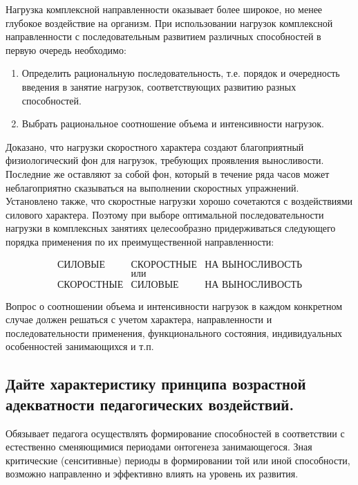 Нагрузка комплексной направленности оказывает более широкое, но менее глубокое воздействие на организм.
При использовании нагрузок комплексной направленности с последовательным развитием различных способностей в первую очередь
необходимо:
\begin{enumerate}
    \item Определить рациональную последовательность, т.е. порядок и очередность введения в занятие нагрузок,
          соответствующих развитию разных способностей.
    \item Выбрать рациональное соотношение объема и интенсивности нагрузок.
\end{enumerate}

Доказано, что нагрузки скоростного характера создают благоприятный физиологический фон для нагрузок, требующих проявления выносливости. Последние же оставляют за собой фон, который в течение ряда часов может неблагоприятно сказываться на выполнении скоростных упражнений. Установлено также, что скоростные нагрузки хорошо сочетаются с воздействиями силового характера. Поэтому при выборе оптимальной последовательности нагрузки в комплексных занятиях целесообразно придерживаться следующего порядка применения по их преимущественной направленности:

\begin{equation*}
    \begin{array}{lcr}
        \text{СИЛОВЫЕ}    & \text{СКОРОСТНЫЕ} & \text{НА ВЫНОСЛИВОСТЬ} \\
                          & \text{или}        &                        \\
        \text{СКОРОСТНЫЕ} & \text{СИЛОВЫЕ}    & \text{НА ВЫНОСЛИВОСТЬ}
    \end{array}
\end{equation*}

Вопрос о соотношении объема и интенсивности нагрузок в каждом конкретном случае должен решаться с учетом характера,
направленности и последовательности применения, функционального состояния, индивидуальных особенностей занимающихся и т.п.


\subsection{Дайте характеристику принципа возрастной адекватности педагогических воздействий.}

Обязывает педагога осуществлять формирование способностей в соответствии с естественно сменяющимися периодами онтогенеза
занимающегося. Зная критические (сенситивные) периоды в формировании той или иной способности, возможно направленно и
эффективно влиять на уровень их развития.


